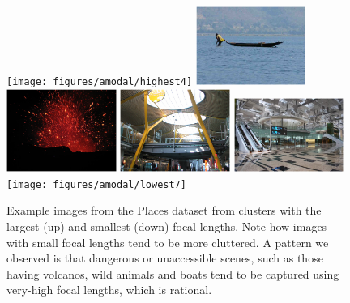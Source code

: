 \begin{figure}
  \centering
  \texttt{[image: figures/amodal/highest4]}
  \includegraphics[width=0.32\textwidth]{figures/amodal/highest3}  
  \includegraphics[width=0.32\textwidth]{figures/amodal/highest6}  
  \includegraphics[width=0.32\textwidth]{figures/amodal/lowest1}
  \includegraphics[width=0.32\textwidth]{figures/amodal/lowest3}  
  \texttt{[image: figures/amodal/lowest7]}
  \caption{ Example images from the Places dataset from clusters with the largest (up) and smallest (down) focal lengths. Note how images with small focal lengths tend to be more cluttered. A pattern we observed is that dangerous or unaccessible scenes, such as those having volcanos, wild animals and boats tend to be captured using very-high focal lengths,  which is rational.}
\end{figure}

